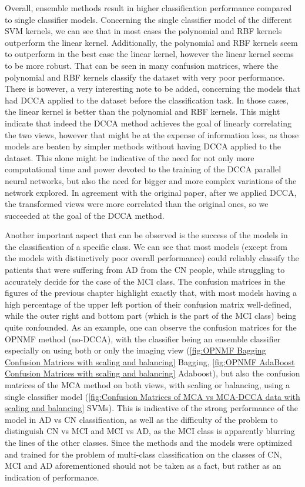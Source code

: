 {%
Overall, ensemble methods result in higher classification performance compared to single classifier models. Concerning the single classifier model of the different SVM kernels, we can see that in most cases the polynomial and RBF kernels outperform the linear kernel. Additionally, the polynomial and RBF kernels seem to outperform in the best case the linear kernel, however the linear kernel seems to be more robust. That can be seen in many confusion matrices, where the polynomial and RBF kernels classify the dataset with very poor performance. There is however, a very interesting note to be added, concerning the models that had DCCA applied to the dataset before the classification task. In those cases, the linear kernel is better than the polynomial and RBF kernels. This might indicate that indeed the DCCA method achieves the goal of linearly correlating the two views, however that might be at the expense of information loss, as those models are beaten by simpler methods without having DCCA applied to the dataset. This alone might be indicative of the need for not only more computational time and power devoted to the training of the DCCA parallel neural networks, but also the need for bigger and more complex variations of the network explored. In agreement with the original paper, after we applied DCCA, the transformed views were more correlated than the original ones, so we succeeded at the goal of the DCCA method.

Another important aspect that can be observed is the success of the models in the classification of a specific class. We can see that most models (except from the models with distinctively poor overall performance) could reliably classify the patients that were suffering from AD from the CN people, while struggling to accurately decide for the case of the MCI class. The confusion matrices in the figures of the previous chapter highlight exactly that, with most models having a high percentage of the upper left portion of their confusion matrix well-defined, while the outer right and bottom part (which is the part of the MCI class) being quite confounded. As an example, one can observe the confusion matrices for the OPNMF method (no-DCCA), with the classifier being an ensemble classifier especially on using both or only the imaging view (\ref{fig:OPNMF Bagging Confusion Matrices with scaling and balancing} Bagging, \ref{fig:OPNMF AdaBoost Confusion Matrices with scaling and balancing} Adaboost), but also the confusion matrices of the MCA method on both views, with scaling or balancing, using a single classifier model (\ref{fig:Confusion Matrices of MCA vs MCA-DCCA data with scaling and balancing} SVMs). This is indicative of the strong performance of the model in AD vs CN classification, as well as the difficulty of the problem to distinguish CN vs MCI and MCI vs AD, as the MCI class is apparently blurring the lines of the other classes. Since the methods and the models were optimized and trained for the problem of multi-class classification on the classes of CN, MCI and AD aforementioned should not be taken as a fact, but rather as an indication of performance. 

}
